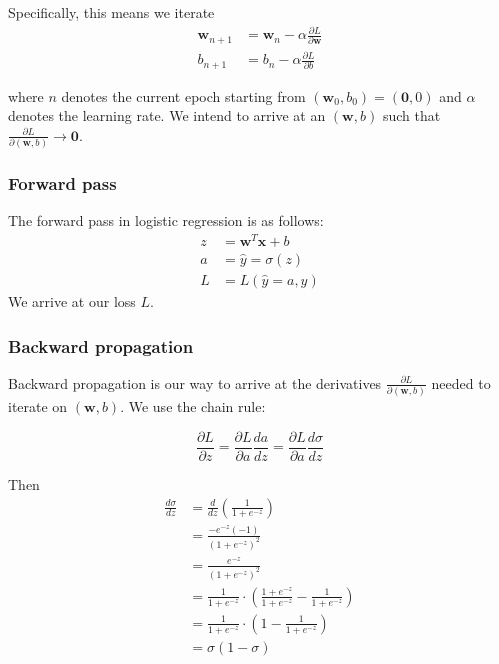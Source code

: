\documentclass[varwidth,border=2cm]{standalone}
\begin{document}
Specifically, this means we iterate
\begin{align}
\bm w_{n+1} &= \bm w_n - \alpha \frac{\partial L}{\partial \bm w} \\
b_{n+1} &= b_n - \alpha \frac{\partial L}{\partial b} \nonumber
\end{align}

where $n$ denotes the current epoch starting from $(\bm w_0, b_0) = (\bm 0, 0)$ and $\alpha$ denotes the learning rate. We intend to arrive at an $(\bm w, b)$ such that $\frac{\partial L}{\partial (\bm w,b)} \rightarrow \bm 0$.

\subsubsection{Forward pass}

The forward pass in logistic regression is as follows:
\begin{align}
z &= \bm w ^T \bm x + b \\
a &=\hat y = \sigma(z) \nonumber \\
L &= L(\hat y=a, y) \nonumber
\end{align}
We arrive at our loss $L$.

\subsubsection{Backward propagation}

Backward propagation is our way to arrive at the derivatives $\frac{\partial L}{\partial (\bm w,b)}$ needed to iterate on $(\bm w,b)$. We use the chain rule:

\begin{equation}
\frac{\partial L}{\partial z} = \frac{\partial L}{\partial a} \frac{da}{dz} = \frac{\partial L}{\partial a} \frac{d\sigma}{dz} \nonumber
\end{equation}

Then
\begin{align}
\frac{d\sigma}{dz} &= \frac{d}{dz} \left( \frac{1}{1 + e^{-z}} \right) \nonumber \\
 &= \frac{-e^{-z}(-1)}{(1 + e^{-z})^2} \nonumber \\
 &= \frac{e^{-z}}{(1 + e^{-z})^2} \nonumber \\
 &= \frac{1}{1 + e^{-z}} \cdot \left(\frac{1 + e^{-z}}{1 + e^{-z}} - \frac{1}{1 + e^{-z}}\right) \nonumber \\
 &= \frac{1}{1 + e^{-z}} \cdot \left(1 - \frac{1}{1 + e^{-z}}\right) \nonumber \\
 &= \sigma (1 - \sigma) \nonumber 
\end{align}
\end{document}
